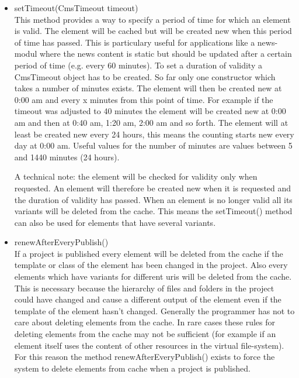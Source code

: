 \begin{itemize}
\item {\meth setTimeout(CmsTimeout timeout)}\\
This method provides a way to specify a period of time for which an element is valid. 
The element will be cached but will be created new when this period of time has passed.
This is particulary useful for applications like a news-modul where the news content is
static but should be updated after a certain period of time (e.g. every 60 minutes).
To set a duration of validity a {\class CmsTimeout} object has to be created. So far only one 
constructor which takes a number of minutes exists. The element will then be created new 
at 0:00 am and every x minutes from this point of time.
For example if the timeout was adjusted to 40 minutes the element will be created new at 
0:00 am and then at 0:40 am, 1:20 am, 2:00 am and so forth. The element will at least be 
created new every 24 hours, this means the counting starts new every day at 0:00 am. 
Useful values for the number of minutes are values between 5 and 1440 minutes (24 hours).

A technical note: the element will be checked for validity only when requested. 
An element will therefore be created new when it is requested and the duration of 
validity has passed. When an element is no longer valid all its variants will be deleted 
from the cache. This means the {\meth setTimeout()} method can also be used for elements that 
have several variants. 

\item {\meth renewAfterEveryPublish()}\\
If a project is published every element will be deleted from the cache if the template 
or class of the element has been changed in the project. Also every elements which have variants
for different uris will be deleted from the cache. This is necessary because the hierarchy 
of files and folders in the project could have changed and cause a different output of the
element even if the template of the element hasn't changed. 
Generally the programmer has not to care about deleting elements from the cache. 
In rare cases these rules for deleting elements from the cache may not be sufficient 
(for example if an element itself uses the content of other resources in the virtual file-system).
For this reason the method {\meth renewAfterEveryPublish()} exists to force the system to delete elements
from cache when a project is published.

\end{itemize}

